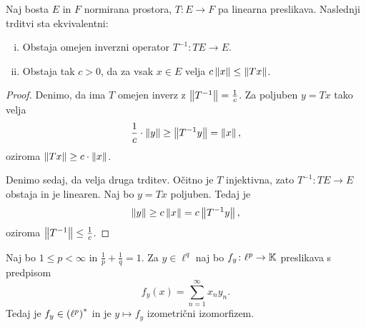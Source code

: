 \begin{trditev}
Naj bosta $E$ in $F$ normirana prostora, $T \colon E \to F$ pa
linearna preslikava. Naslednji trditvi sta ekvivalentni:

\begin{enumerate}[i)]
\item Obstaja omejen inverzni operator $T^{-1} \colon TE \to E$.
\item Obstaja tak $c > 0$, da za vsak $x \in E$ velja
$c \left\lVert x\right\rVert \leq \left\lVert Tx\right\rVert$.
\end{enumerate}
\end{trditev}

\begin{proof}
Denimo, da ima $T$ omejen inverz z $\left\lVert T^{-1}\right\rVert = \frac{1}{c}$.
Za poljuben $y = Tx$ tako velja
\[
\frac{1}{c} \cdot \left\lVert y\right\rVert \geq \left\lVert T^{-1}y\right\rVert = \left\lVert x\right\rVert,
\]
oziroma $\left\lVert Tx\right\rVert \geq c \cdot \left\lVert x\right\rVert$.

Denimo sedaj, da velja druga trditev. Očitno je $T$ injektivna,
zato $T^{-1} \colon TE \to E$ obstaja in je linearen. Naj bo
$y = Tx$ poljuben. Tedaj je
\[
\left\lVert y\right\rVert \geq c \left\lVert x\right\rVert = c \left\lVert T^{-1}y\right\rVert,
\]
oziroma $\left\lVert T^{-1}\right\rVert \leq \frac{1}{c}$.
\end{proof}

\begin{izrek}
Naj bo $1 \leq p < \infty$ in $\frac{1}{p} + \frac{1}{q} = 1$. Za
$y \in \ell^q$ naj bo $f_y \colon \ell^p \to \mathbb{K}$ preslikava s
predpisom
\[
f_y(x) = \sum_{n=1}^\infty x_n y_n.
\]
Tedaj je $f_y \in \left(\ell^p\right)^*$ in je $y \mapsto f_y$ izometrični
izomorfizem.
\end{izrek}

